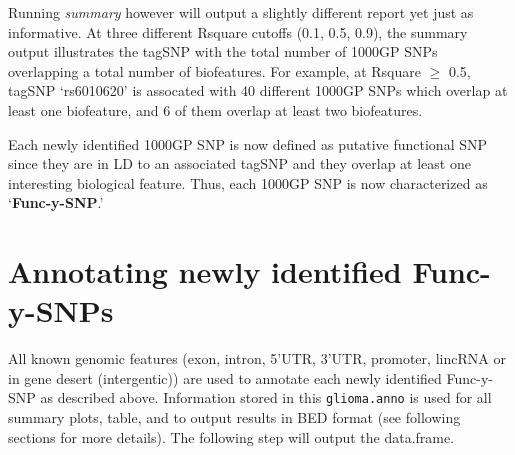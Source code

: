 \documentclass[12pt,fullpage]{article}
\newcommand{\Robject}[1]{{\texttt{#1}}}
\newcommand{\Rmethod}[1]{{\textit{#1}}}
\begin{document}
Running \Rmethod{summary} however will output a slightly different report yet
just as informative. At three different Rsquare cutoffs (0.1, 0.5, 0.9), the
summary output illustrates the tagSNP with the total number of 1000GP SNPs
overlapping a total number of biofeatures. For example, at Rsquare $\ge$ 0.5,
tagSNP `rs6010620' is assocated with 40 different 1000GP SNPs which overlap at
least one biofeature, and 6 of them overlap at least two biofeatures.

Each newly identified 1000GP SNP is now defined as putative functional SNP since
they are in LD to an associated tagSNP and they overlap at least one interesting
biological feature. Thus, each 1000GP SNP is now characterized as
`\textbf{Func-y-SNP}.'

\section{Annotating newly identified Func-y-SNPs}

All known genomic features (exon, intron, 5'UTR, 3'UTR, promoter, lincRNA or in
gene desert (intergentic)) are used to annotate each newly identified Func-y-SNP
as described above. Information stored in this \Robject{glioma.anno} is used for
all summary plots, table, and to output results in BED format (see following
sections for more details). The following step will output the data.frame.
\end{document}
